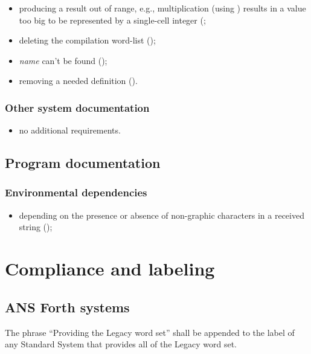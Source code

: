 \begin{itemize}
\item producing a result out of range, e.g., multiplication
	(using \word{*}) results in a value too big to be represented by
	a single-cell integer
	(;
\item deleting the compilation word-list ();
\item \emph{name} can't be found ();
\item removing a needed definition ().
\end{itemize}

\subsubsection{Other system documentation} %

\begin{itemize}
\item no additional requirements.
\end{itemize}

\subsection{Program documentation} %

\subsubsection{Environmental dependencies} %

\begin{itemize}
\item depending on the presence or absence of non-graphic characters
	in a received string ();
\end{itemize}


\section{Compliance and labeling} %

\subsection{ANS Forth systems} %

The phrase ``Providing the Legacy word set'' shall be appended to
the label of any Standard System that provides all of the Legacy
word set.

